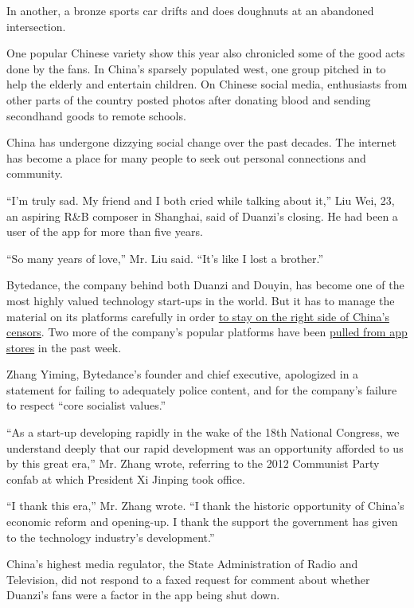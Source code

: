 In another, a bronze sports car drifts and does doughnuts at an
abandoned intersection.

One popular Chinese variety show this year also chronicled some of the
good acts done by the fans. In China's sparsely populated west, one
group pitched in to help the elderly and entertain children. On Chinese
social media, enthusiasts from other parts of the country posted photos
after donating blood and sending secondhand goods to remote schools.

China has undergone dizzying social change over the past decades. The
internet has become a place for many people to seek out personal
connections and community.

``I'm truly sad. My friend and I both cried while talking about it,''
Liu Wei, 23, an aspiring R\&B composer in Shanghai, said of Duanzi's
closing. He had been a user of the app for more than five years.

``So many years of love,'' Mr. Liu said. ``It's like I lost a brother.''

Bytedance, the company behind both Duanzi and Douyin, has become one of
the most highly valued technology start-ups in the world. But it has to
manage the material on its platforms carefully in order
\href{https://www.nytimes.com/2018/01/02/business/china-toutiao-censorship.html}{to
stay on the right side of China's censors}. Two more of the company's
popular platforms have been
\href{https://www.nytimes.com/2018/04/06/technology/china-censor-teen-moms.html}{pulled
from app stores} in the past week.

Zhang Yiming, Bytedance's founder and chief executive, apologized in a
statement for failing to adequately police content, and for the
company's failure to respect ``core socialist values.''

``As a start-up developing rapidly in the wake of the 18th National
Congress, we understand deeply that our rapid development was an
opportunity afforded to us by this great era,'' Mr. Zhang wrote,
referring to the 2012 Communist Party confab at which President Xi
Jinping took office.

``I thank this era,'' Mr. Zhang wrote. ``I thank the historic
opportunity of China's economic reform and opening-up. I thank the
support the government has given to the technology industry's
development.''

China's highest media regulator, the State Administration of Radio and
Television, did not respond to a faxed request for comment about whether
Duanzi's fans were a factor in the app being shut down.


